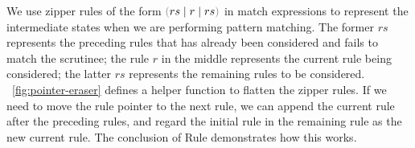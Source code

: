 We use zipper rules of the form $\zrulsP{rs}{r}{rs}$ in match expressions to represent the intermediate states when we are performing pattern matching.
The former $rs$ represents the preceding rules that has already been considered and fails to match the scrutinee; the rule $r$ in the middle represents the current rule being considered; the latter $rs$ represents the remaining rules to be considered.
\figurename~\ref{fig:pointer-eraser} defines a helper function to flatten the zipper rules.
If we need to move the rule pointer to the next rule, we can append the current rule after the preceding rules, and regard the initial rule in the remaining rule as the new current rule.
The conclusion of Rule \ITFailMatch demonstrates how this works.





